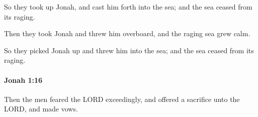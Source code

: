			\begin{versebox}
					\item[BHS] 
					\item[LXX] 
					\item[ASV] So they took up Jonah, and cast him forth into the sea; and the sea ceased from its raging.
					\item[NIV] Then they took Jonah and threw him overboard, and the raging sea grew calm.
					\item[NRSV] So they picked Jonah up and threw him into the sea; and the sea ceased from its raging.
			\end{versebox}

		\paragraph{Jonah 1:16} %
			\label{JONAH-1-16}

			Then the men feared the LORD exceedingly, and offered a sacrifice unto the LORD, and made vows.

